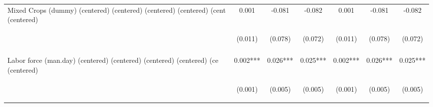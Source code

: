 \begin{center}
\begin{tabular}{lcccccc}
Mixed Crops (dummy) (centered) (centered) (centered) (centered) (cent (centered) & 0.001 & -0.081 & -0.082 & 0.001 & -0.081 & -0.082 \\
 & \begin{footnotesize}(0.011)\end{footnotesize} & \begin{footnotesize}(0.078)\end{footnotesize} & \begin{footnotesize}(0.072)\end{footnotesize} & \begin{footnotesize}(0.011)\end{footnotesize} & \begin{footnotesize}(0.078)\end{footnotesize} & \begin{footnotesize}(0.072)\end{footnotesize} \\
\vspace{4pt} & \begin{footnotesize}[0.949]\end{footnotesize} & \begin{footnotesize}[0.297]\end{footnotesize} & \begin{footnotesize}[0.250]\end{footnotesize} & \begin{footnotesize}[0.949]\end{footnotesize} & \begin{footnotesize}[0.297]\end{footnotesize} & \begin{footnotesize}[0.250]\end{footnotesize} \\
Labor force (man.day) (centered) (centered) (centered) (centered) (ce (centered) & 0.002*** & 0.026*** & 0.025*** & 0.002*** & 0.026*** & 0.025*** \\
 & \begin{footnotesize}(0.001)\end{footnotesize} & \begin{footnotesize}(0.005)\end{footnotesize} & \begin{footnotesize}(0.005)\end{footnotesize} & \begin{footnotesize}(0.001)\end{footnotesize} & \begin{footnotesize}(0.005)\end{footnotesize} & \begin{footnotesize}(0.005)\end{footnotesize} \\

\end{tabular}
\end{center}
